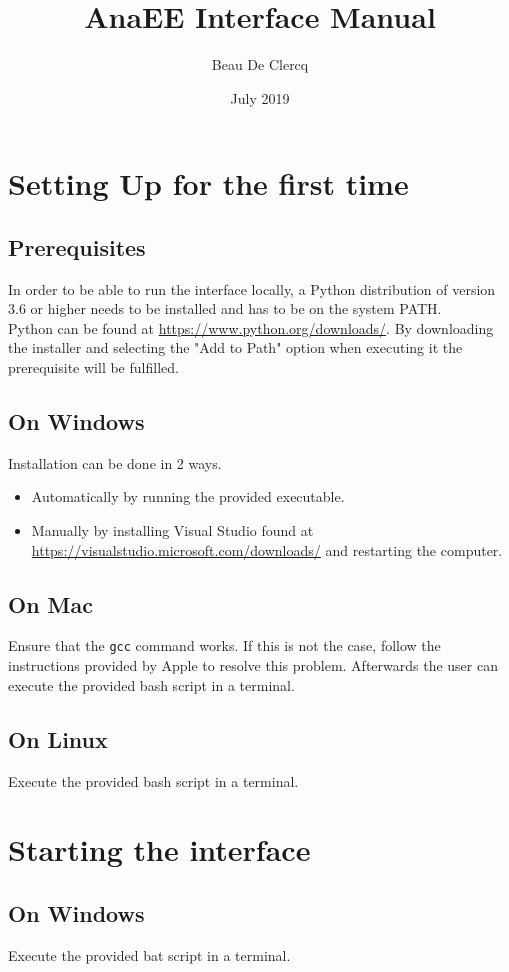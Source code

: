 \documentclass[12pt]{article}
\title{AnaEE Interface Manual}
\author{Beau De Clercq}
\date{July 2019}
\begin{document}
\maketitle{}

\tableofcontents

\clearpage
\newpage

\section{Setting Up for the first time}
\subsection{Prerequisites}
In order to be able to run the interface locally, a Python distribution of version 3.6 or higher needs to be installed and has to be on the system PATH.\\
Python can be found at \url{https://www.python.org/downloads/}. By downloading the installer and selecting the "Add to Path" option when executing it the prerequisite will be fulfilled.
\subsection{On Windows}
Installation can be done in 2 ways.
\begin{itemize}
	\item Automatically by running the provided executable.
	\item Manually by installing Visual Studio found at \url{https://visualstudio.microsoft.com/downloads/} and restarting the computer. 
\end{itemize}
\subsection{On Mac}
Ensure that the \texttt{gcc} command works. If this is not the case, follow the instructions provided by Apple to resolve this problem. Afterwards the user can execute the provided bash script in a terminal.
\subsection{On Linux}
Execute the provided bash script in a terminal.
\newpage
\section{Starting the interface}
\subsection{On Windows}
Execute the provided bat script in a terminal.
\end{document}
